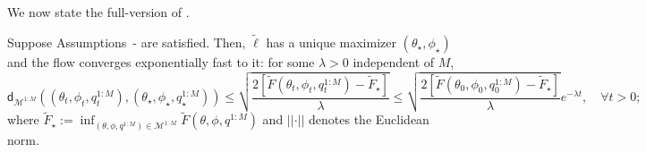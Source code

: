 We now state the full-version of .

\begin{theorem}\label{thm:exp_convg_appendix}
    Suppose Assumptions~- are satisfied. Then, $\tilde{\ell}$ has a unique maximizer $(\theta_\star, \phi_\star)$ and the flow converges exponentially fast to it: for some $\lambda>0$ independent of $M$, 
\begin{equation}\label{eq:app_thm_exp}
        \mathsf{d}_{\mathcal{M}^{1:M}}((\theta_t,\phi_t,q_t^{1:M}),(\theta_\star,\phi_\star,q_{\star}^{1:M}))
        \leq
        \sqrt{\frac{2[\tilde{F}(\theta_t, \phi_t, q_t^{1:M}) - \tilde{F}_\star]}{\lambda}}
        \leq
        \sqrt{\frac{2[\tilde{F}(\theta_0, \phi_0, q_0^{1:M})-\tilde{F}_\star]}{\lambda}}e^{-\lambda t}, \quad \forall t>0;
\end{equation}
where $\tilde{F}_\star:=\inf_{(\theta,\phi,q^{1:M})\in \mathcal{M}^{1:M}}\tilde{F}(\theta,\phi,q^{1:M})$ and $\vert\vert\cdot\vert\vert$ denotes the Euclidean norm.
\end{theorem}

